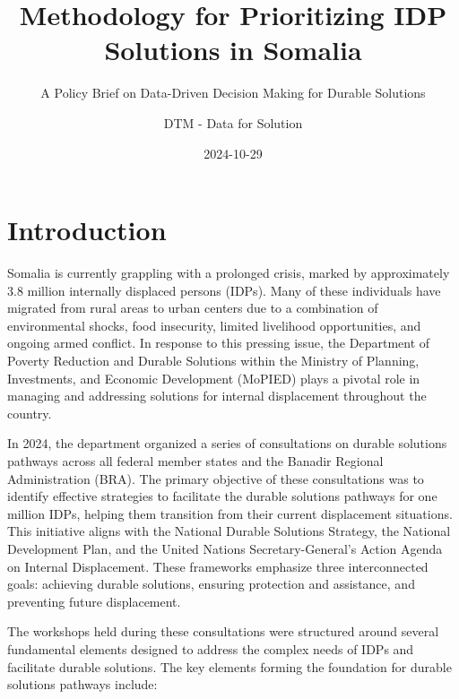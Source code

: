 \documentclass[
]{report}
\title{Methodology for Prioritizing IDP Solutions in Somalia}
\subtitle{A Policy Brief on Data-Driven Decision Making for Durable
Solutions}
\author{DTM - Data for Solution}
\date{2024-10-29}
\begin{document}
\maketitle

{
\setcounter{tocdepth}{3}
\tableofcontents
}

\newpage

\chapter{Introduction}\label{introduction}

Somalia is currently grappling with a prolonged crisis, marked by
approximately 3.8 million internally displaced persons (IDPs). Many of
these individuals have migrated from rural areas to urban centers due to
a combination of environmental shocks, food insecurity, limited
livelihood opportunities, and ongoing armed conflict. In response to
this pressing issue, the Department of Poverty Reduction and Durable
Solutions within the Ministry of Planning, Investments, and Economic
Development (MoPIED) plays a pivotal role in managing and addressing
solutions for internal displacement throughout the country.

In 2024, the department organized a series of consultations on durable
solutions pathways across all federal member states and the Banadir
Regional Administration (BRA). The primary objective of these
consultations was to identify effective strategies to facilitate the
durable solutions pathways for one million IDPs, helping them transition
from their current displacement situations. This initiative aligns with
the National Durable Solutions Strategy, the National Development Plan,
and the United Nations Secretary-General's Action Agenda on Internal
Displacement. These frameworks emphasize three interconnected goals:
achieving durable solutions, ensuring protection and assistance, and
preventing future displacement.

The workshops held during these consultations were structured around
several fundamental elements designed to address the complex needs of
IDPs and facilitate durable solutions. The key elements forming the
foundation for durable solutions pathways include:
\end{document}
